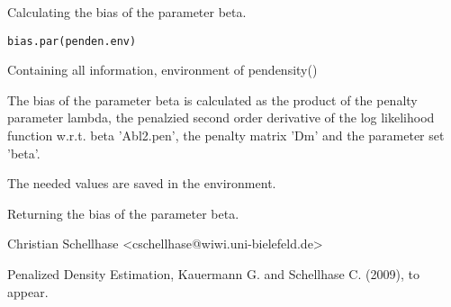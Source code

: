 \begin{Description}\relax
Calculating the bias of the parameter beta.
\end{Description}
\begin{Usage}
\begin{verbatim}
bias.par(penden.env)
\end{verbatim}
\end{Usage}
\begin{Arguments}
\begin{ldescription}
\item[\code{penden.env}] Containing all information, environment of pendensity()
\end{ldescription}
\end{Arguments}
\begin{Details}\relax
The bias of the parameter beta is calculated as the product of the penalty parameter lambda, the penalzied second order derivative of the log likelihood function w.r.t. beta 'Abl2.pen', the penalty matrix 'Dm' and the parameter set 'beta'.

The needed values are saved in the environment.
\end{Details}
\begin{Value}
Returning the bias of the parameter beta.
\end{Value}
\begin{Author}\relax
Christian Schellhase <cschellhase@wiwi.uni-bielefeld.de>
\end{Author}
\begin{References}\relax
Penalized Density Estimation, Kauermann G. and Schellhase C. (2009), to appear.
\end{References}

